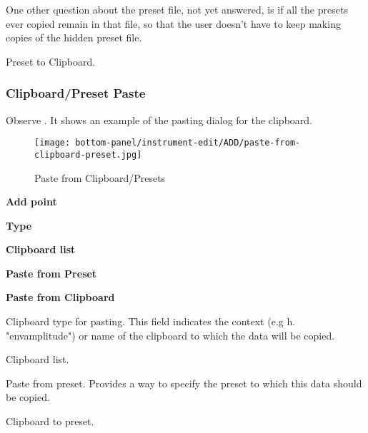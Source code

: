    One other question about the preset file, not yet answered, is if all
   the presets ever copied remain in that file, so that the user doesn't
   have to keep making copies of the hidden preset file.

   Preset to Clipboard.

\subsubsection{Clipboard/Preset Paste}
\label{subsubsec:clipboard_paste}

   Observe .
   It shows an example of the pasting dialog for the clipboard.

\begin{figure}[H]
   \centering 
   \texttt{[image: bottom-panel/instrument-edit/ADD/paste-from-clipboard-preset.jpg]}
   \caption[Paste from Clipboard]{Paste from Clipboard/Presets}
   \label{fig:paste_to_clipboard} 
\end{figure}

   \begin{enumber}
      \item \textbf{Add point}
      \item \textbf{Type}
      \item \textbf{Clipboard list}
      \item \textbf{Paste from Preset}
      \item \textbf{Paste from Clipboard}
   \end{enumber}

   \setcounter{ItemCounter}{0}      %

   Clipboard type for pasting.  
   This field indicates the context (e.g h. "envamplitude") or name of the
   clipboard to which the data will be copied.

   Clipboard list.

   Paste from preset.
   Provides a way to specify the preset to which this data should be
   copied.

   Clipboard to preset.

